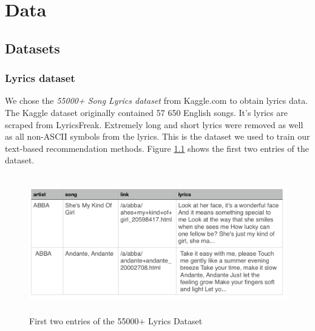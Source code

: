 \chapter{Data}

\section{Datasets}

\subsection{Lyrics dataset}
 We chose the \textit{55000+ Song Lyrics dataset} from Kaggle.com to obtain lyrics data. The Kaggle dataset originally contained 57 650 English songs. It’s lyrics are scraped from LyricsFreak. Extremely long and short lyrics were removed as well as all non-ASCII symbols from the lyrics. This is the dataset we used to train our text-based recommendation methods. Figure \ref{fig:lyrics_dataset} shows the first two entries of the dataset.\\
 \begin{figure}[h]
    \centering
	\includegraphics[height=60mm]{./img/dataset_preview.png}
	\caption{First two entries of the 55000+ Lyrics Dataset}
	\label{fig:lyrics_dataset}
\end{figure}

